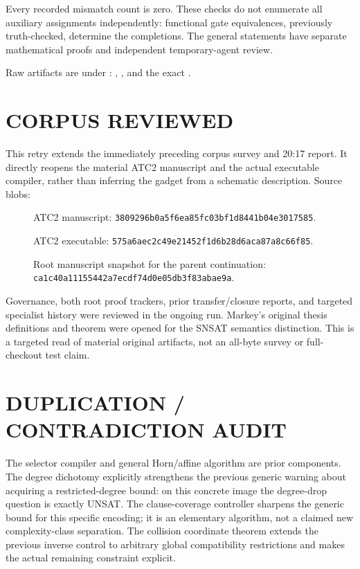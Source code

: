 \documentclass[11pt]{article}
\begin{document}
Every recorded mismatch count is zero.
These checks do not enumerate all auxiliary assignments independently:
functional gate equivalences, previously truth-checked, determine
the completions. The general statements have separate mathematical
proofs and independent temporary-agent review.

Raw artifacts are under
:
, ,
and the exact .

\section*{CORPUS REVIEWED}
This retry extends the immediately preceding corpus survey and
20:17 report. It directly reopens the material ATC2 manuscript and
the actual executable compiler, rather than inferring the gadget
from a schematic description. Source blobs:
\begin{description}
\item[] ATC2 manuscript:
\texttt{3809296b0a5f6ea85fc03bf1d8441b04e3017585}.
\item[] ATC2 executable:
\texttt{575a6aec2c49e21452f1d6b28d6aca87a8c66f85}.
\item[] Root manuscript snapshot for the parent continuation:
\texttt{ca1c40a11155442a7ecdf74d0e05db3f83abae9a}.
\end{description}
Governance, both root proof trackers, prior transfer/closure reports,
and targeted specialist history were reviewed in the ongoing run.
Markey's original thesis definitions and theorem were opened for
the SNSAT semantics distinction.
This is a targeted read of material original artifacts, not an
all-byte survey or full-checkout test claim.

\section*{DUPLICATION / CONTRADICTION AUDIT}
The selector compiler and general Horn/affine algorithm are prior
components. The degree dichotomy explicitly strengthens the previous
generic warning about acquiring a restricted-degree bound:
on this concrete image the degree-drop question is exactly UNSAT.
The clause-coverage controller sharpens the generic bound for this
specific encoding; it is an elementary algorithm, not a claimed new
complexity-class separation.
The collision coordinate theorem extends the previous inverse control
to arbitrary global compatibility restrictions and makes the actual
remaining constraint explicit.
\end{document}
